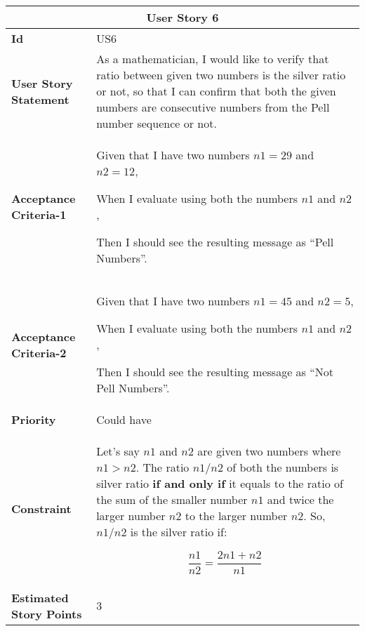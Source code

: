\hspace{1cm}
\begin{center}
\begin{tabular}{ | m{2.3cm} | m{12cm} | } 

 \hline
 \multicolumn{2}{|c|}{\textbf{User Story 6}} \\

\hline
\textbf{Id} & US6 \\ 

\hline
\textbf{User Story Statement} & As a mathematician, I would like to verify that ratio between given two numbers is the silver ratio or not, so that I can confirm that both the given numbers are consecutive numbers from the Pell number sequence or not.\\ 

\hline
\textbf{Acceptance Criteria-1} & Given that I have two numbers $n1=29$ and $n2=12$,

When I evaluate using both the numbers $n1$ and $n2$,

Then I should see the resulting message as ``Pell Numbers''. \\ 

\hline
\textbf{Acceptance Criteria-2} & Given that I have two numbers $n1=45$ and $n2=5$,

When I evaluate using both the numbers $n1$ and $n2$,

Then I should see the resulting message as ``Not Pell Numbers''. \\

\hline
\textbf{Priority} & Could have \\ 

\hline
\textbf{Constraint} & Let's say $n1$ and $n2$ are given two numbers where $ n1 > n2 $. The ratio $n1/n2$ of both the numbers is silver ratio \textbf{if and only if} it equals to the ratio of the sum of the smaller number $n1$ and twice the larger number $n2$ to the larger number $n2$. So, $n1/n2$ is the silver ratio if:

\[\frac{n1}{n2}=\frac{2n1 + n2}{n1} \] \\ 

\hline
\textbf{Estimated Story Points} & 3 \\ 
\hline

\end{tabular}
\end{center}
